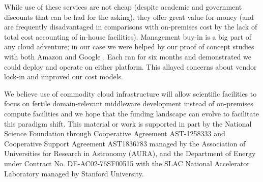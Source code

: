 \documentclass[11pt,twoside]{article}
\begin{document}
While use of these services are not cheap (despite academic and government discounts that can be had for the asking), they offer great value for money (and are frequently disadvantaged in comparisons with on-premises cost by the lack of total cost accounting of in-house facilities).
Management buy-in is a big part of any cloud adventure; in our case we were helped by our proof of concept studies with both Amazon \citep{2020arXiv201106044B,DMTN-137} and Google \citep{DMTN-125}. Each ran for six months and demonstrated we could deploy and operate on either platform. This allayed concerns about vendor lock-in and improved our cost models.

We believe use of commodity cloud infrastructure will allow scientific facilities to focus on fertile domain-relevant middleware development instead of on-premises compute facilities and we hope that the funding landscape can evolve to facilitate this paradigm shift.
{\tiny This material or work is supported in part by the National Science Foundation through Cooperative Agreement AST-1258333 and Cooperative Support Agreement AST1836783 managed by the Association of Universities for Research in Astronomy (AURA), and the Department of Energy under Contract No. DE-AC02-76SF00515 with the SLAC National Accelerator Laboratory managed by Stanford University.
}
\end{document}
